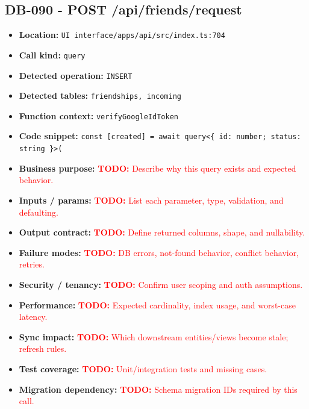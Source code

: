 \documentclass[11pt]{article}
\newcommand{\todoitem}[1]{\textcolor{red}{\textbf{TODO:} #1}}
\begin{document}
\subsection{DB-090 - POST /api/friends/request}
\begin{itemize}[leftmargin=1.5em]
\item \textbf{Location:} \texttt{UI interface/apps/api/src/index.ts:704}
\item \textbf{Call kind:} \texttt{query}
\item \textbf{Detected operation:} \texttt{INSERT}
\item \textbf{Detected tables:} \texttt{friendships, incoming}
\item \textbf{Function context:} \texttt{verifyGoogleIdToken}
\item \textbf{Code snippet:} \texttt{const [created] = await query<\{ id: number; status: string \}>(}
\item \textbf{Business purpose:} \todoitem{Describe why this query exists and expected behavior.}
\item \textbf{Inputs / params:} \todoitem{List each parameter, type, validation, and defaulting.}
\item \textbf{Output contract:} \todoitem{Define returned columns, shape, and nullability.}
\item \textbf{Failure modes:} \todoitem{DB errors, not-found behavior, conflict behavior, retries.}
\item \textbf{Security / tenancy:} \todoitem{Confirm user scoping and auth assumptions.}
\item \textbf{Performance:} \todoitem{Expected cardinality, index usage, and worst-case latency.}
\item \textbf{Sync impact:} \todoitem{Which downstream entities/views become stale; refresh rules.}
\item \textbf{Test coverage:} \todoitem{Unit/integration tests and missing cases.}
\item \textbf{Migration dependency:} \todoitem{Schema migration IDs required by this call.}
\end{itemize}
\end{document}

